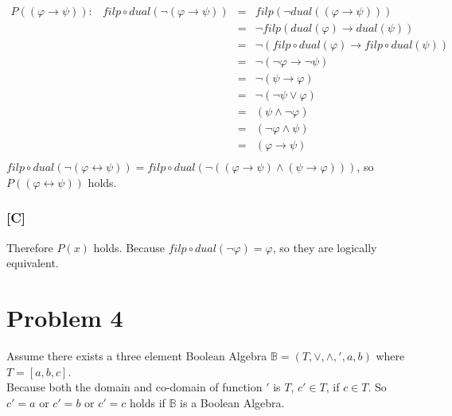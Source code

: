 \documentclass{article} %
\begin{document}
\[\begin{array}{lrll}
\\
    P((\varphi \to \psi)):&     filp\circ dual(\neg (\varphi \to \psi)) &=& filp(\neg dual((\varphi \to \psi)))\\
                                                                        &&=& \neg filp(dual(\varphi) \to dual(\psi))\\
                                                                        &&=& \neg (filp \circ dual(\varphi) \to filp \circ dual(\psi))\\
                                                                        &&=& \neg(\neg \varphi \to \neg \psi)\\
                                                                        &&=& \neg(\psi \to \varphi)\\
                                                                        &&=& \neg(\neg \psi \vee \varphi)\\
                                                                        &&=& (\psi \wedge \neg \varphi)\\
                                                                        &&=& (\neg \varphi \wedge \psi)\\
                                                                        &&=& (\varphi \to \psi)\\
                                                                    
\end{array}\]
$filp\circ dual(\neg (\varphi \leftrightarrow \psi)) = filp\circ dual(\neg((\varphi \to \psi) \wedge (\psi \to \varphi)))$, so $P((\varphi \leftrightarrow \psi))$ holds.\\
\subsubsection*{[C]}
Therefore $P(x)$ holds. Because $filp \circ dual(\neg \varphi) = \varphi$, so they are logically equivalent.\\
\section*{Problem 4}
Assume there exists a three element Boolean Algebra $\mathbb{B} = (T, \vee, \wedge, ', a, b)$ where $T =[a, b, c]$.\\
Because both the domain and co-domain of function $'$ is $T$, $c' \in T$, if $c \in T$. So $c' = a$ or $c' = b$ or $c' = c$ holds if $\mathbb{B}$ is a Boolean Algebra.\\
\end{document}
